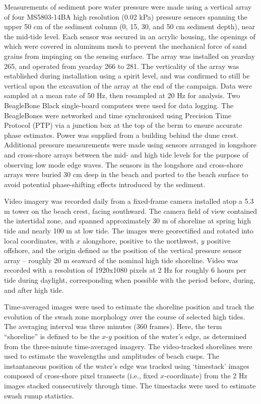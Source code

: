 Measurements of sediment pore water pressure were made using a vertical array of four MS5803-14BA high resolution (0.02 kPa) pressure sensors spanning the upper 50 cm of the sediment column (0, 15, 30, and 50 cm sediment depth), near the mid-tide level. Each sensor was secured in an acrylic housing, the openings of which were covered in aluminum mesh to prevent the mechanical force of sand grains from impinging on the sensing surface. The array was installed on yearday 265, and operated from yearday 266 to 281. The verticality of the array was established during installation using a spirit level, and was confirmed to still be vertical upon the excavation of the array at the end of the campaign. Data were sampled at a mean rate of 50 Hz, then resampled at 20 Hz for analysis. Two BeagleBone Black single-board computers were used for data logging. The BeagleBones were networked and time synchronised using Precision Time Protocol (PTP) via a junction box at the top of the berm to ensure accurate phase estimates. Power was supplied from a building behind the dune crest. Additional pressure measurements were made using sensors arranged in longshore and cross-shore arrays between the mid- and high tide levels for the purpose of observing low mode edge waves. The sensors in the longshore and cross-shore arrays were buried 30 cm deep in the beach and ported to the beach surface to avoid potential phase-shifting effects introduced by the sediment. 

Video imagery was recorded daily from a fixed-frame camera installed atop a 5.3 m tower on the beach crest, facing southward. The camera field of view contained the intertidal zone, and spanned approximately 30 m of shoreline at spring high tide and nearly 100 m at low tide. The images were georectified and rotated into local coordinates, with $x$ alongshore, positive to the northwest, $y$ positive offshore, and the origin defined as the position of the vertical pressure sensor array -- roughly 20 m seaward of the nominal high tide shoreline. Video was recorded with a resolution of 1920x1080 pixels at 2 Hz for roughly 6 hours per tide during daylight, corresponding when possible with the period before, during, and after high tide.  

Time-averaged images were used to estimate the shoreline position and track the evolution of the swash zone morphology over the course of selected high tides. The averaging interval was three minutes (360 frames). Here, the term ``shoreline'' is defined to be the $x$-$y$ position of the water's edge, as determined from the three-minute time-averaged imagery. The video-tracked shorelines were used to estimate the wavelengths and amplitudes of beach cusps. The instantaneous position of the water's edge was tracked using `timestack' images composed of cross-shore pixel transects (i.e., fixed $x$-coordinate) from the 2 Hz images stacked consecutively through time. The timestacks were used to estimate swash runup statistics.

